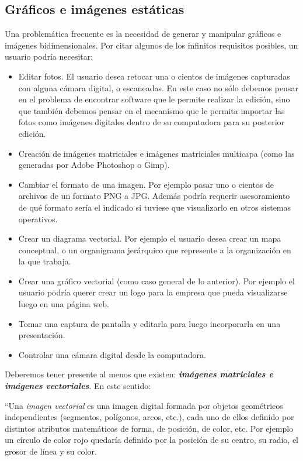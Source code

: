 \documentclass[12pt]{article}
\begin{document}
\subsection*{Gráficos e imágenes estáticas}

Una problemática frecuente es la necesidad de generar y manipular gráficos e imágenes 
bidimensionales. Por citar algunos de los infinitos requisitos posibles, un usuario 
podría necesitar: 
\begin{itemize}
	\item Editar fotos. El usuario desea retocar una o cientos de imágenes capturadas
	      con alguna cámara digital, o escaneadas. En este caso no sólo debemos pensar en el problema de 
	      encontrar software que le permite realizar la edición, sino que también debemos
	      pensar en el mecanismo que le permita importar las fotos como imágenes digitales
	      dentro de su computadora para su posterior edición.    
	\item Creación de imágenes matriciales e imágenes matriciales multicapa (como las generadas por 
	Adobe Photoshop o Gimp).  
	\item Cambiar el formato de una imagen. Por ejemplo pasar uno o cientos de archivos de 
	un formato PNG a JPG. Además podría requerir asesoramiento de qué formato sería el 
	indicado si tuviese que visualizarlo en otros sistemas operativos. 
	\item Crear un diagrama vectorial. Por ejemplo el usuario desea crear un mapa conceptual, o
	un organigrama jerárquico que represente a la organización en la que trabaja.    
	\item Crear una gráfico vectorial (como caso general de lo anterior). Por ejemplo el 
	usuario podría querer crear un logo para la empresa que pueda visualizarse luego en 
	una página web.  
	\item Tomar una captura de pantalla y editarla para luego incorporarla en una presentación. 
	\item Controlar una cámara digital desde la computadora. 
\end{itemize}

Deberemos tener presente al menos que existen: {\bf{\it imágenes matriciales e imágenes vectoriales}}. 
En este sentido:  

``Una {\it imagen vectorial} es una imagen digital formada por objetos geométricos independientes (segmentos, 
polígonos, arcos, etc.), cada uno de ellos definido por distintos atributos matemáticos de forma, de 
posición, de color, etc. Por ejemplo un círculo de color rojo quedaría definido por la posición 
de su centro, su radio, el grosor de línea y su color.
\end{document}

